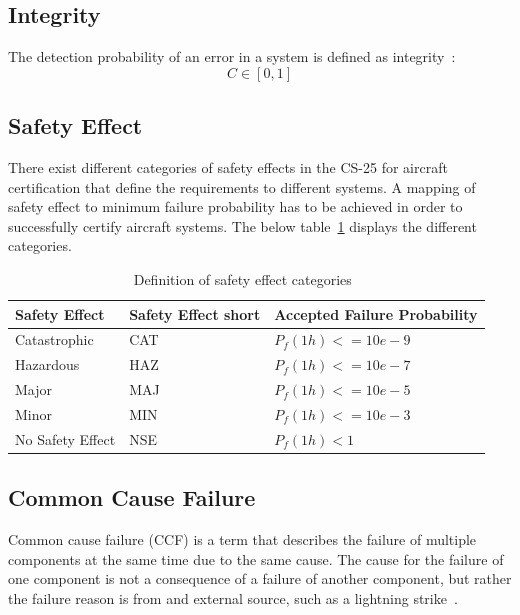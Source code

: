 \subsection{Integrity}\label{subsec:integrity}
The detection probability of an error in a system is defined as integrity~\cite{lfs2}:
\begin{equation}
    \label{eq:integrity}
    C \in [0,1]
\end{equation}
\subsection{Safety Effect}\label{subsec:safety-effect}
There exist different categories of safety effects in the CS-25 for aircraft certification that define the requirements to different systems.
A mapping of safety effect to minimum failure probability has to be achieved in order to successfully certify aircraft systems.
The below table~\ref{tab:safety-effect} displays the different categories.
\begin{table}[!htb]
    \centering
    \begin{tabular}{l|l|l}
        Safety Effect    & Safety Effect short & Accepted Failure Probability \\ \hline
        Catastrophic     & CAT                 & $P_f(1h) <= 10e-9$           \\
        Hazardous        & HAZ                 & $P_f(1h) <= 10e-7$           \\
        Major            & MAJ                 & $P_f(1h) <= 10e-5$           \\
        Minor            & MIN                 & $P_f(1h) <= 10e-3$           \\
        No Safety Effect & NSE                 & $P_f(1h) < 1$
    \end{tabular}
    \caption{Definition of safety effect categories~\cite{lfs1}}
    \label{tab:safety-effect}
\end{table}
\subsection{Common Cause Failure}\label{subsec:common-cause-failure}
Common cause failure (CCF) is a term that describes the failure of multiple components at the same time due to the same cause.
The cause for the failure of one component is not a consequence of a failure of another component, but rather the failure reason is from and
external source, such as a lightning strike~\cite{ccf,cmf}.

